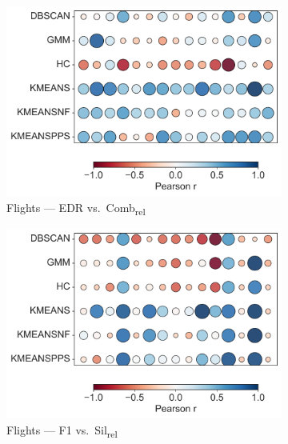 \documentclass[10pt]{article} %
\numberwithin{equation}{section}
\begin{document}
\begin{figure}[htbp]
  \begin{subfigure}[b]{0.33\linewidth}
    \includegraphics[width=\linewidth]{figures/6.4.3graph/FL_EDR_vs_Comb_relative.pdf}
    \caption{Flights — EDR vs.\ Comb\textsubscript{rel}}
    \label{fig:fl_edr_comb}
  \end{subfigure}\hfill
  \begin{subfigure}[b]{0.33\linewidth}
    \includegraphics[width=\linewidth]{figures/6.4.3graph/FL_F1_vs_Sil_relative.pdf}
    \caption{Flights — F1 vs.\ Sil\textsubscript{rel}}
    \label{fig:fl_f1_sil}
  \end{subfigure}\hfill
  \begin{subfigure}[b]{0.33\linewidth}

\end{subfigure}
\end{figure}
\end{document}

